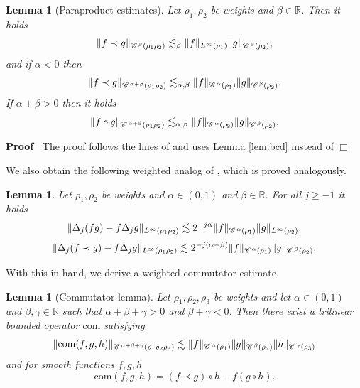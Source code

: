 \documentclass[a4paper,11pt]{article}
\renewcommand{\geq}{\geqslant}
\newenvironment{proof}{\noindent\textbf{Proof\ }}{\hspace*{\fill}$\Box$\medskip}
\newtheorem{lemma}[theorem]{Lemma}
\numberwithin{equation}{section}
\newcommand{\CC}{\mathscr{C} \hspace{.1em}}
\newcommand{\R}{\mathbb{R}}
\newcommand{\8}{\infty}
\begin{document}
\begin{lemma}[Paraproduct estimates]\label{lem:para}
Let $\rho_{1},\rho_{2}$ be  weights  and $\beta\in\R$. Then  it holds
\begin{equation*}%
\|f\prec g\|_{\CC^\beta(\rho_{1}\rho_{2})}\lesssim_\beta\|f\|_{L^\infty(\rho_{1})}\|g\|_{\CC^{\beta}(\rho_{2})},
\end{equation*}
and if $\alpha<0$ then
\begin{equation*}%
\|f\prec g\|_{\CC^{\alpha+\beta}(\rho_{1}\rho_{2})}\lesssim_{\alpha,\beta}\|f\|_{\CC^{\alpha}(\rho_{1})}\|g\|_{\CC^{\beta}(\rho_{2})}.
\end{equation*}
If  $\alpha+\beta>0$ then it holds
\begin{equation*}%
\|f\circ g\|_{\CC^{\alpha+\beta}(\rho_{1}\rho_{2})}\lesssim_{\alpha,\beta}\|f\|_{\CC^{\alpha}(\rho_{2})}\|g\|_{\CC^{\beta}(\rho_{2})}.
\end{equation*}
\end{lemma}

\begin{proof}
The proof follows the lines of \cite[Lemma 2.1]{GIP} and uses  Lemma \ref{lem:bcd} instead of \cite[Lemma A.3]{GIP}
\end{proof}

We also obtain the following weighted analog of \cite[Lemma 2.2, Lemma 2.3]{GIP}, which is proved analogously.


\begin{lemma}\label{lem:2.2}
Let $\rho_{1},\rho_{2}$ be  weights   and $\alpha\in(0,1)$ and $\beta\in\R$. For all $j\geq -1$ it holds
$$
\|\Delta_j(fg)-f\Delta_jg\|_{L^\infty(\rho_{1}\rho_{2})}\lesssim 2^{-j\alpha}\|f\|_{\CC^{\alpha}(\rho_{1})}\|g\|_{L^\infty(\rho_{2})}.
$$
$$
\|\Delta_j(f\prec g)-f\Delta_j g\|_{L^\infty(\rho_{1}\rho_{2})}\lesssim 2^{-j(\alpha+\beta)}\|f\|_{\CC^\alpha(\rho_{1})}\|g\|_{\CC^\beta(\rho_{2})}.
$$
\end{lemma}

With this in hand, we derive a weighted commutator estimate.

\begin{lemma}[Commutator lemma]\label{lem:com}
Let $\rho_{1}, \rho_{2}, \rho_{3}$ be  weights and let $\alpha\in (0,1)$ and $\beta,\gamma\in \R$ such that $\alpha+\beta+\gamma>0$ and $\beta+\gamma<0$. Then there exist a trilinear bounded operator $\mathrm{com}$ satisfying
$$
\|\mathrm{com}(f,g,h)\|_{\CC^{\alpha+\beta+\gamma}(\rho_{1}\rho_{2}\rho_{3})}\lesssim \|f\|_{\CC^\alpha(\rho_{1})}\|g\|_{\CC^\beta(\rho_{2})}\|h\|_{\CC^\gamma(\rho_{3})}
$$
and for smooth functions $f,g,h$
$$
\mathrm{com}(f,g,h)=(f\prec g)\circ h - f(g\circ h).
$$
\end{lemma}
\end{document}
